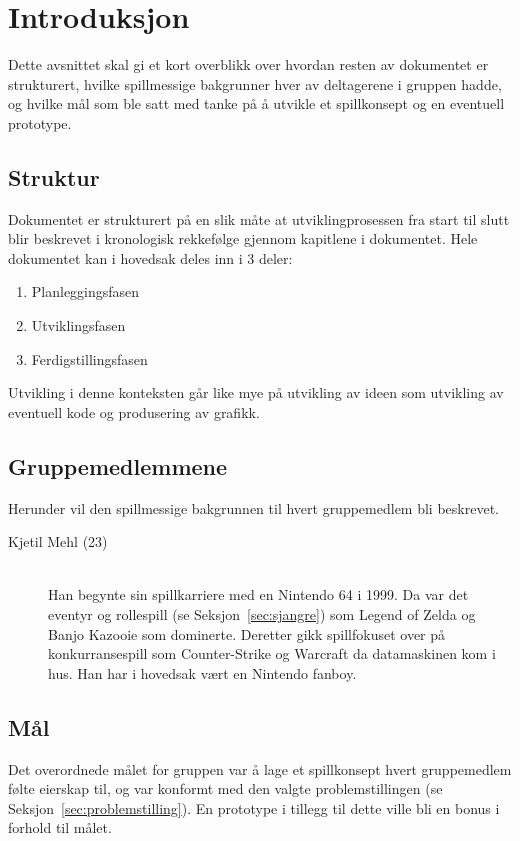 \section{Introduksjon}
Dette avsnittet skal gi et kort overblikk over hvordan resten av
dokumentet er strukturert, hvilke spillmessige bakgrunner hver av
deltagerene i gruppen hadde, og hvilke mål som ble satt med tanke på å
utvikle et spillkonsept og en eventuell prototype.
\subsection{Struktur}
Dokumentet er strukturert på en slik måte at utviklingprosessen fra
start til slutt blir beskrevet i kronologisk rekkefølge gjennom
kapitlene i dokumentet. Hele dokumentet kan i hovedsak deles inn i 3
deler:
\begin{enumerate}
	\item Planleggingsfasen
	\item Utviklingsfasen
	\item Ferdigstillingsfasen
\end{enumerate}
Utvikling i denne konteksten går like mye på utvikling av ideen som
utvikling av eventuell kode og produsering av grafikk.
\subsection{Gruppemedlemmene}
Herunder vil den spillmessige bakgrunnen til hvert gruppemedlem bli
beskrevet.
\begin{description}
\item[Kjetil Mehl (23)] \hfill \\
Han begynte sin spillkarriere med en Nintendo 64\cite{n64} i 1999. Da
var det eventyr og rollespill (se Seksjon~\ref{sec:sjangre}) som Legend
of Zelda\cite{legendofzelda} og Banjo Kazooie\cite{banjokazooie} som
dominerte. Deretter gikk spillfokuset  over på konkurransespill som
Counter-Strike og Warcraft da datamaskinen kom i hus. Han har i hovedsak
vært en Nintendo fanboy\cite{fanboy}.
\end{description}
\subsection{Mål}
Det overordnede målet for gruppen var å lage et spillkonsept hvert
gruppemedlem følte eierskap til, og var konformt med den valgte
problemstillingen (se Seksjon~\ref{sec:problemstilling}). En prototype i
tillegg til dette ville bli en bonus i forhold til målet.
